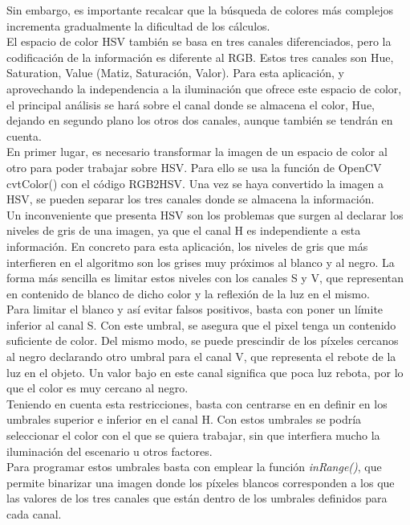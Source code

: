 Sin embargo, es importante recalcar que la búsqueda de colores más complejos incrementa gradualmente la dificultad de los cálculos.\\

El espacio de color HSV también se basa en tres canales diferenciados, pero la codificación de la información es diferente al RGB. Estos tres canales son Hue, Saturation, Value (Matiz, Saturación, Valor). Para esta aplicación, y aprovechando la independencia a la iluminación que ofrece este espacio de color, el principal análisis se hará sobre el canal donde se almacena el color, Hue, dejando en segundo plano los otros dos canales, aunque también se tendrán en cuenta.\\

En primer lugar, es necesario transformar la imagen de un espacio de color al otro para poder trabajar sobre HSV.  Para ello se usa la función de OpenCV cvtColor() con el código RGB2HSV. Una vez se haya convertido la imagen a HSV, se pueden separar los tres canales donde se almacena la información.\\

Un inconveniente que presenta HSV son los problemas que surgen al declarar los niveles de gris de una imagen, ya que el canal H es independiente a esta información. En concreto para esta aplicación, los niveles de gris que más interfieren en el algoritmo son los grises muy próximos al blanco y al negro. La forma más sencilla es limitar estos niveles con los canales S y V, que representan en contenido de blanco de dicho color y la reflexión de la luz en el mismo.\\

Para limitar el blanco y así evitar falsos positivos, basta con poner un límite inferior al canal S. Con este umbral, se asegura que el pixel tenga un contenido suficiente de color. Del mismo modo, se puede prescindir de los píxeles cercanos al negro declarando otro umbral para el canal V, que representa el rebote de la luz en el objeto. Un valor bajo en este canal significa que poca luz rebota, por lo que el color es muy cercano al negro.\\

Teniendo en cuenta esta restricciones, basta con centrarse en en definir en los umbrales superior e inferior en el canal H. Con estos umbrales se podría seleccionar el color con el que se quiera trabajar, sin que interfiera mucho la iluminación del escenario u otros factores.\\

Para programar estos umbrales basta con emplear la función \textit{inRange()}, que permite binarizar una imagen donde los píxeles blancos corresponden a los que las valores de los tres canales que están dentro de los umbrales definidos para cada canal.\\


